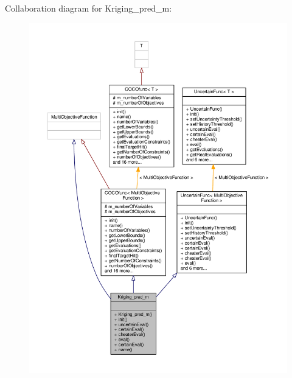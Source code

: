 Collaboration diagram for Kriging\+\_\+pred\+\_\+m\+:
\nopagebreak
\begin{figure}[H]
\begin{center}
\leavevmode
\includegraphics[width=350pt]{classKriging__pred__m__coll__graph}
\end{center}
\end{figure}
